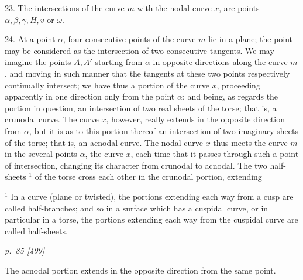 \documentclass[11pt,a4paper]{article}
\newcommand{\pagemarker}[2]{\clearpage\noindent\textit{p.~#1 [#2]}\par\medskip}
\begin{document}
23. The intersections of the curve \(m\) with the nodal curve \(x\), are points
\(\alpha,\beta,\gamma,H,v\) or \(\omega\).

24. At a point \(\alpha\), four consecutive points of the curve \(m\) lie in a plane;
the point may be considered as the intersection of two consecutive tangents. We may
imagine the points \(A,A'\) starting from \(\alpha\) in opposite directions along the curve
\(m\), and moving in such manner that the tangents at these two points respectively
continually intersect; we have thus a portion of the curve \(x\), proceeding apparently
in one direction only from the point \(\alpha\); and being, as regards the portion in
question, an intersection of two real sheets of the torse; that is, a crunodal curve.
The curve \(x\), however, really extends in the opposite direction from \(\alpha\), but it
is as to this portion thereof an intersection of two imaginary sheets of the torse; that
is, an acnodal curve. The nodal curve \(x\) thus meets the curve \(m\) in the several
points \(\alpha\), the curve \(x\), each time that it passes through such a point of
intersection, changing its character from crunodal to acnodal. The two half-sheets
\({}^{1}\) of the torse cross each other in the crunodal portion, extending

\footnotesize
\noindent\({}^{1}\) In a curve (plane or twisted), the portions extending each way from a cusp are called
half-branches; and so in a surface which has a cuspidal curve, or in particular in a
torse, the portions extending each way from the cuspidal curve are called half-sheets.
\normalsize

\pagemarker{85}{499}
The acnodal portion extends in the opposite direction from the same point.
\end{document}

